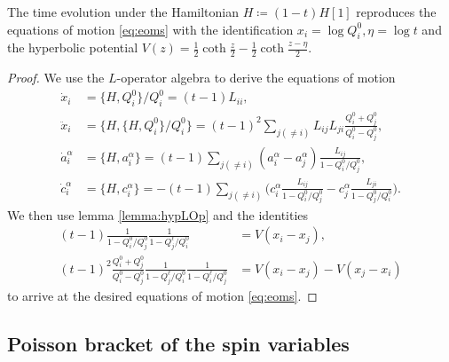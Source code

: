 \begin{theorem}
The time evolution under the Hamiltonian $H \coloneq (1-t) H[1]$ reproduces the equations of motion \eqref{eq:eoms} with the identification $x_i = \log Q_i^0, \eta = \log t$ and the hyperbolic potential $V(z) = \tfrac{1}{2} \coth \tfrac{z}{2}-\tfrac{1}{2} \coth \tfrac{z-\eta}{2}$.
\end{theorem}

\begin{proof}
    We use the $L$-operator algebra to derive the equations of motion
    \begin{align*}
        \dot x_i &= \{ H,Q_i^0 \} / Q_i^0 = (t-1)L_{ii},
        \\[4pt]
        \ddot x_i &= \{ H, \{ H,Q_i^0 \} / Q_i^0 \} = (t-1)^2 \sum_{j(\neq i)} L_{ij} L_{ji} \frac{Q_i^0+Q_j^0}{Q_i^0-Q_j^0}, \\
        \dot a_i^\alpha &= \{ H,a_i^\alpha \} = (t-1)\sum_{j(\neq i)} (a_i^\alpha-a_j^\alpha) \frac{L_{ij}}{1-Q_i^0/Q_j^0}, \\
        \dot c_i^\alpha &= \{ H,c_i^\alpha \} = -(t-1)\sum_{j(\neq i)} \Big( c_i^\alpha \frac{L_{ij}}{1-Q_i^0/Q_j^0} - c_j^\alpha \frac{L_{ji}}{1-Q_j^0/Q_i^0} \Big).
    \end{align*}
    We then use lemma \ref{lemma:hypLOp} and the identities
    \begin{align*}
        (t-1)\frac{1}{1-Q_i^0/Q_j^0} \frac{1}{1-Q_j^\ell/Q_i^0} &= V(x_i-x_j), \\
        (t-1)^2\frac{Q_i^0+Q_j^0}{Q_i^0-Q_j^0} \frac{1}{1-Q_j^\ell/Q_i^0} \frac{1}{1-Q_i^\ell/Q_j^0} &= V(x_i-x_j)-V(x_j-x_i)
    \end{align*}
    to arrive at the desired equations of motion \eqref{eq:eoms}.
\end{proof}

\subsection{Poisson bracket of the spin variables}

